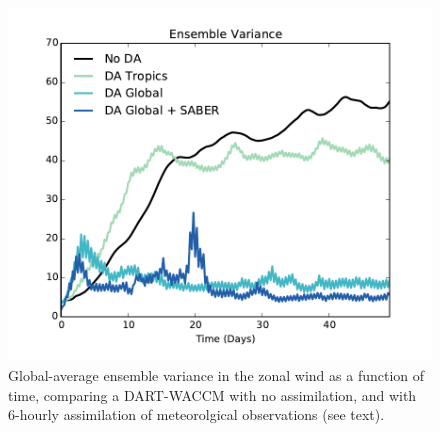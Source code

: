  \begin{figure}
	 \includegraphics[width=\textwidth]{Paper_figures/ERPDA_paper_evalvariable_state_space.pdf}
	 \caption{Global-average ensemble variance in the zonal wind as a function of time, comparing a DART-WACCM with no assimilation, and with 6-hourly assimilation of meteorolgical observations (see text).}
	 \label{fig:evalvariable_state}
\end{figure}
